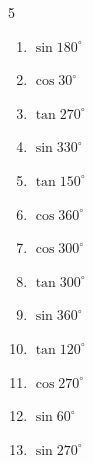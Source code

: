\begin{multicols}{5}
\begin{enumerate}
  \item $\displaystyle \sin{180^\circ}$

        \phantom{$\displaystyle =0$}

  \item $\displaystyle \cos{30^\circ}$


  \item $\displaystyle \tan{270^\circ}$

        \phantom{$\displaystyle なし$}

  \item $\displaystyle \sin{330^\circ}$


  \item $\displaystyle \tan{150^\circ}$


  \item $\displaystyle \cos{360^\circ}$

        \phantom{$\displaystyle =1$}

  \item $\displaystyle \cos{300^\circ}$


  \item $\displaystyle \tan{300^\circ}$


  \item $\displaystyle \sin{360^\circ}$

        \phantom{$\displaystyle =0$}

  \item $\displaystyle \tan{120^\circ}$


  \item $\displaystyle \cos{270^\circ}$

        \phantom{$\displaystyle =0$}

  \item $\displaystyle \sin{60^\circ}$


  \item $\displaystyle \sin{270^\circ}$

        \phantom{$\displaystyle =-1$}


\end{enumerate}
\end{multicols}
